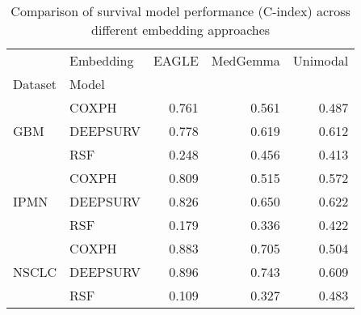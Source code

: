 \begin{table}
\caption{Comparison of survival model performance (C-index) across different embedding approaches}
\label{tab:baseline_comparison}
\begin{tabular}{llrrr}
\toprule
 & Embedding & EAGLE & MedGemma & Unimodal \\
Dataset & Model &  &  &  \\
\midrule
\multirow[t]{3}{*}{GBM} & COXPH & 0.761 & 0.561 & 0.487 \\
 & DEEPSURV & 0.778 & 0.619 & 0.612 \\
 & RSF & 0.248 & 0.456 & 0.413 \\
\cline{1-5}
\multirow[t]{3}{*}{IPMN} & COXPH & 0.809 & 0.515 & 0.572 \\
 & DEEPSURV & 0.826 & 0.650 & 0.622 \\
 & RSF & 0.179 & 0.336 & 0.422 \\
\cline{1-5}
\multirow[t]{3}{*}{NSCLC} & COXPH & 0.883 & 0.705 & 0.504 \\
 & DEEPSURV & 0.896 & 0.743 & 0.609 \\
 & RSF & 0.109 & 0.327 & 0.483 \\
\cline{1-5}
\bottomrule
\end{tabular}
\end{table}
